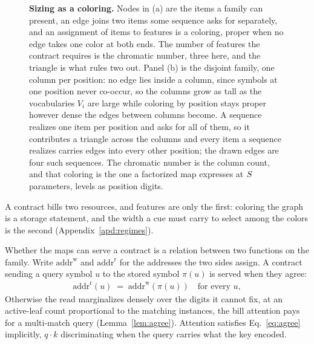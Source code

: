 \begin{figure}[H]
\begin{minipage}[b]{0.47\linewidth}
\end{minipage}
\caption{\textbf{Sizing as a coloring.} Nodes in (a) are the items a family can present, an edge joins two items some sequence asks for separately, and an assignment of items to features is a coloring, proper when no edge takes one color at both ends. The number of features the contract requires is the chromatic number, three here, and the triangle is what rules two out. Panel (b) is the disjoint family, one column per position: no edge lies inside a column, since symbols at one position never co-occur, so the columns grow as tall as the vocabularies $V_i$ are large while coloring by position stays proper however dense the edges between columns become. A sequence realizes one item per position and asks for all of them, so it contributes a triangle across the columns and every item a sequence realizes carries edges into every other position; the drawn edges are four such sequences. The chromatic number is the column count, and that coloring is the one a factorized map expresses at $S$ parameters, levels as position digits.}
\label{fig:coloring}
\end{figure}

A contract bills two resources, and features are only the first: coloring the graph is a storage statement, and the width a cue must carry to select among the colors is the second (Appendix~\ref{apd:regimes}).


Whether the maps can serve a contract is a relation between two functions on the family. Write $\mathrm{addr}^{\mathrm{w}}$ and $\mathrm{addr}^{\mathrm{r}}$ for the addresses the two sides assign. A contract sending a query symbol $u$ to the stored symbol $\pi(u)$ is served when they agree:
\begin{align}
  \mathrm{addr}^{\mathrm{r}}(u) \;=\; \mathrm{addr}^{\mathrm{w}}\!\left(\pi(u)\right)
  \quad \text{for every } u ,
  \label{eq:agree}
\end{align}
Otherwise the read marginalizes densely over the digits it cannot fix, at an active-leaf count proportional to the matching instances, the bill attention pays for a multi-match query (Lemma~\ref{lem:agree}). Attention satisfies Eq.~\eqref{eq:agree} implicitly, $q \cdot k$ discriminating when the query carries what the key encoded.

